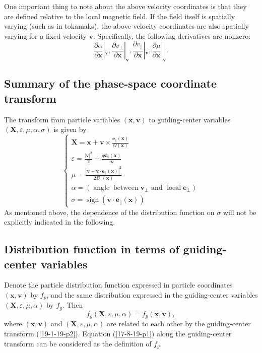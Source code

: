 \documentclass{llncs}
\newcommand{\infixand}{\text{ and }}
\newcommand{\nobracket}{}
\newcommand{\tmmathbf}[1]{\ensuremath{\boldsymbol{#1}}}
\newcommand{\tmop}[1]{\ensuremath{\operatorname{#1}}}
\begin{document}
One important thing to note about the above velocity coordinates is that they
are defined relative to the local magnetic field. If the field itself is
spatially varying (such as in tokamaks), the above velocity coordinates are
also spatially varying for a fixed velocity $\mathbf{v}$. Specifically, the
following derivatives are nonzero:
\begin{equation}
  \frac{\partial \alpha}{\partial \mathbf{x}} |_{\mathbf{v}} \nobracket,
  \frac{\partial v_{\perp}}{\partial \mathbf{x}} |_{\mathbf{v}} \nobracket,
  \frac{\partial v_{\parallel}}{\partial \mathbf{x}} |_{\mathbf{v}}
  \nobracket, \frac{\partial \mu}{\partial \mathbf{x}} |_{\mathbf{v}}
  \nobracket .
\end{equation}

\subsection{Summary of the phase-space coordinate transform}

The transform from particle variables $(\mathbf{x}, \mathbf{v})$ to
guiding-center variables $(\mathbf{X}, \varepsilon, \mu, \alpha, \sigma)$ is
given by
\begin{equation}
  \label{21-8-25-a1} \left\{\begin{array}{l}
    \mathbf{X} =\mathbf{x}+\mathbf{v} \times \frac{\tmmathbf{e}_{\parallel}
    (\mathbf{x})}{\Omega (\mathbf{x})}\\
    \varepsilon = \frac{| \mathbf{v} |^2}{2} + \frac{q \Phi_0
    (\mathbf{x})}{m}\\
    \mu = \frac{| \mathbf{v}-\mathbf{v} \cdot \mathbf{e}_{\parallel}
    (\mathbf{x}) |^2}{2 B_0 (\mathbf{x})}\\
    \alpha = \left( \tmop{angle} \tmop{between} \mathbf{v}_{\perp} \infixand
    \tmop{local} \mathbf{e}_{\perp} \right)\\
    \sigma = \tmop{sign} (\mathbf{v} \cdot \mathbf{e}_{\parallel}
    (\mathbf{x}))
  \end{array}\right.
\end{equation}
As mentioned above, the dependence of the distribution function on $\sigma$
will not be explicitly indicated in the following.

\subsection{Distribution function in terms of guiding-center variables}

Denote the particle distribution function expressed in particle coordinates
$(\mathbf{x}, \mathbf{v})$ by $f_p$, and the same distribution expressed in
the guiding-center variables $(\mathbf{X}, \varepsilon, \mu, \alpha)$ by
$f_g$. Then
\begin{equation}
  \label{17-8-19-p1} f_g (\mathbf{X}, \varepsilon, \mu, \alpha) = f_p
  (\mathbf{x}, \mathbf{v}),
\end{equation}
where $(\mathbf{x}, \mathbf{v})$ and $(\mathbf{X}, \varepsilon, \mu, \alpha)$
are related to each other by the guiding-center transform (\ref{19-1-19-p2}).
Equation (\ref{17-8-19-p1}) along the guiding-center transform can be
considered as the definition of $f_g$.
\end{document}
